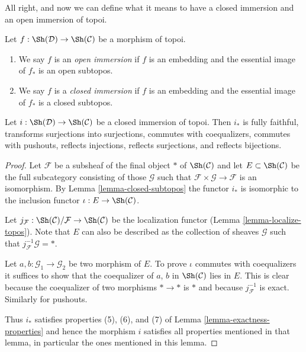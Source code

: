 \noindent
All right, and now we can define what it means to have a closed immersion
and an open immersion of topoi.

\begin{definition}
\label{definition-immersion-topoi}
Let $f : \Sh(\mathcal{D}) \to \Sh(\mathcal{C})$ be a morphism of topoi.
\begin{enumerate}
\item We say $f$ is an {\it open immersion} if $f$ is an embedding
and the essential image of $f_*$ is an open subtopos.
\item We say $f$ is a {\it closed immersion} if $f$ is an embedding
and the essential image of $f_*$ is a closed subtopos.
\end{enumerate}
\end{definition}

\begin{lemma}
\label{lemma-closed-immersion}
Let $i : \Sh(\mathcal{D}) \to \Sh(\mathcal{C})$ be a closed immersion of
topoi. Then $i_*$ is fully faithful, transforms surjections into surjections,
commutes with coequalizers, commutes with pushouts, reflects injections,
reflects surjections, and reflects bijections.
\end{lemma}

\begin{proof}
Let $\mathcal{F}$ be a subsheaf of the final object $*$ of $\Sh(\mathcal{C})$
and let $E \subset \Sh(\mathcal{C})$ be the full subcategory consisting
of those $\mathcal{G}$ such that
$\mathcal{F} \times \mathcal{G} \to \mathcal{F}$ is an isomorphism.
By Lemma \ref{lemma-closed-subtopos}
the functor $i_*$ is isomorphic to the
inclusion functor $\iota : E \to \Sh(\mathcal{C})$.

\medskip\noindent
Let $j_{\mathcal{F}} : \Sh(\mathcal{C})/\mathcal{F} \to \Sh(\mathcal{C})$
be the localization functor (Lemma \ref{lemma-localize-topos}).
Note that $E$ can also be described as
the collection of sheaves $\mathcal{G}$ such that
$j_\mathcal{F}^{-1}\mathcal{G} = *$.

\medskip\noindent
Let $a, b : \mathcal{G}_1 \to \mathcal{G}_2$ be two morphism of $E$.
To prove $\iota$ commutes with coequalizers it suffices to show that
the coequalizer of $a$, $b$ in $\Sh(\mathcal{C})$ lies in $E$.
This is clear because
the coequalizer of two morphisms $* \to *$ is $*$ and because
$j_\mathcal{F}^{-1}$ is exact. Similarly for pushouts.

\medskip\noindent
Thus $i_*$ satisfies properties (5), (6), and (7) of
Lemma \ref{lemma-exactness-properties} and hence
the morphism $i$ satisfies all properties mentioned in that
lemma, in particular the ones mentioned in this lemma.
\end{proof}








